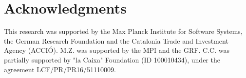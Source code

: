 \section{Acknowledgments}

This research was supported by the Max Planck Institute for Software Systems, the German Research Foundation and the Catalonia Trade
and Investment Agency (ACCI{\'O}).
%
M.Z. was supported by the MPI and the GRF.
%
C.C. was partially supported by "la Caixa" Foundation (ID 100010434), under the agreement LCF/PR/PR16/51110009.
%
